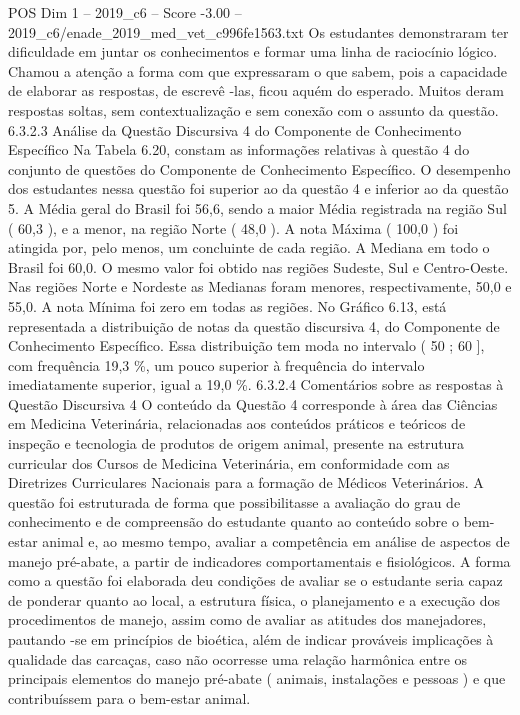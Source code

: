 \begin{textsample}{POS Dim 1 – 2019\_c6 – Score -3.00 – 2019\_c6/enade\_2019\_med\_vet\_c996fe1563.txt}
Os estudantes demonstraram ter dificuldade em juntar os conhecimentos e formar uma linha de raciocínio lógico.
Chamou a atenção a forma com que expressaram o que sabem, pois a capacidade de elaborar as respostas, de escrevê -las, ficou aquém do esperado.
Muitos deram respostas soltas, sem contextualização e sem conexão com o assunto da questão. 6.3.2.3 Análise da Questão Discursiva 4 do Componente de Conhecimento Específico Na Tabela 6.20, constam as informações relativas à questão 4 do conjunto de questões do Componente de Conhecimento Específico.
O desempenho dos estudantes nessa questão foi superior ao da questão 4 e inferior ao da questão 5.
A Média geral do Brasil foi 56,6, sendo a maior Média registrada na região Sul ( 60,3 ), e a menor, na região Norte ( 48,0 ).
A nota Máxima ( 100,0 ) foi atingida por, pelo menos, um concluinte de cada região.
A Mediana em todo o Brasil foi 60,0.
O mesmo valor foi obtido nas regiões Sudeste, Sul e Centro-Oeste.
Nas regiões Norte e Nordeste as Medianas foram menores, respectivamente, 50,0 e 55,0.
A nota Mínima foi zero em todas as regiões.
No Gráfico 6.13, está representada a distribuição de notas da questão discursiva 4, do Componente de Conhecimento Específico.
Essa distribuição tem moda no intervalo ( 50 ; 60 ], com frequência 19,3 \%, um pouco superior à frequência do intervalo imediatamente superior, igual a 19,0 \%. 6.3.2.4 Comentários sobre as respostas à Questão Discursiva 4 O conteúdo da Questão 4 corresponde à área das Ciências em Medicina Veterinária, relacionadas aos conteúdos práticos e teóricos de inspeção e tecnologia de produtos de origem animal, presente na estrutura curricular dos Cursos de Medicina Veterinária, em conformidade com as Diretrizes Curriculares Nacionais para a formação de Médicos Veterinários.
A questão foi estruturada de forma que possibilitasse a avaliação do grau de conhecimento e de compreensão do estudante quanto ao conteúdo sobre o bem-estar animal e, ao mesmo tempo, avaliar a competência em análise de aspectos de manejo pré-abate, a partir de indicadores comportamentais e fisiológicos.
A forma como a questão foi elaborada deu condições de avaliar se o estudante seria capaz de ponderar quanto ao local, a estrutura física, o planejamento e a execução dos procedimentos de manejo, assim como de avaliar as atitudes dos manejadores, pautando -se em princípios de bioética, além de indicar prováveis implicações à qualidade das carcaças, caso não ocorresse uma relação harmônica entre os principais elementos do manejo pré-abate ( animais, instalações e pessoas ) e que contribuíssem para o bem-estar animal.

\end{textsample}
